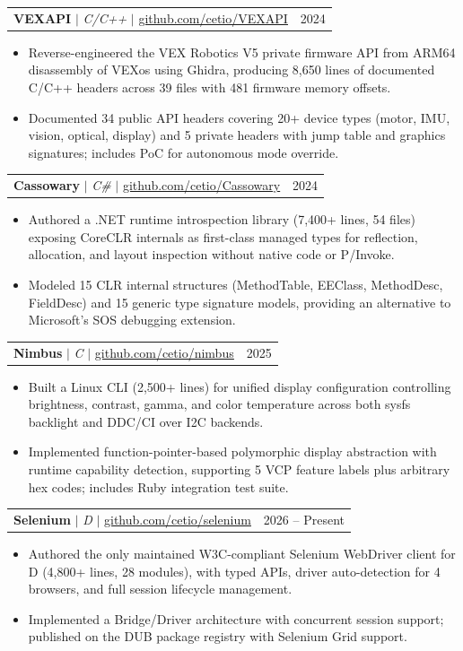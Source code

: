 \documentclass[letterpaper,11pt]{article}
\makeatletter
\newcommand{\resumeItem}[1]{
  \item\small{
    {#1 \vspace{0pt}}
  }
}
\newcommand{\resumeProjectHeading}[2]{
    \item
    \begin{tabular*}{0.97\textwidth}{l@{\extracolsep{\fill}}r}
      \small#1 & #2 \\
    \end{tabular*}\vspace{-5pt}
}
\newcommand{\resumeItemListStart}{\begin{itemize}[leftmargin=0.15in]}
\newcommand{\resumeItemListEnd}{\end{itemize}\vspace{-4pt}}
\makeatother
\begin{document}
      \resumeProjectHeading
          {\textbf{VEXAPI} $|$ \emph{C/C++} $|$ \href{https://github.com/cetio/VEXAPI}{\underline{github.com/cetio/VEXAPI}}}{2024}
          \resumeItemListStart
            \resumeItem{Reverse-engineered the VEX Robotics V5 private firmware API from ARM64 disassembly of VEXos using Ghidra, producing 8,650 lines of documented C/C++ headers across 39 files with 481 firmware memory offsets.}
            \resumeItem{Documented 34 public API headers covering 20+ device types (motor, IMU, vision, optical, display) and 5 private headers with jump table and graphics signatures; includes PoC for autonomous mode override.}
          \resumeItemListEnd

      \resumeProjectHeading
          {\textbf{Cassowary} $|$ \emph{C\#} $|$ \href{https://github.com/cetio/Cassowary}{\underline{github.com/cetio/Cassowary}}}{2024}
          \resumeItemListStart
            \resumeItem{Authored a .NET runtime introspection library (7,400+ lines, 54 files) exposing CoreCLR internals as first-class managed types for reflection, allocation, and layout inspection without native code or P/Invoke.}
            \resumeItem{Modeled 15 CLR internal structures (MethodTable, EEClass, MethodDesc, FieldDesc) and 15 generic type signature models, providing an alternative to Microsoft's SOS debugging extension.}
          \resumeItemListEnd

      \resumeProjectHeading
          {\textbf{Nimbus} $|$ \emph{C} $|$ \href{https://github.com/cetio/nimbus}{\underline{github.com/cetio/nimbus}}}{2025}
          \resumeItemListStart
            \resumeItem{Built a Linux CLI (2,500+ lines) for unified display configuration controlling brightness, contrast, gamma, and color temperature across both sysfs backlight and DDC/CI over I2C backends.}
            \resumeItem{Implemented function-pointer-based polymorphic display abstraction with runtime capability detection, supporting 5 VCP feature labels plus arbitrary hex codes; includes Ruby integration test suite.}
          \resumeItemListEnd

      \resumeProjectHeading
          {\textbf{Selenium} $|$ \emph{D} $|$ \href{https://www.github.com/cetio/selenium}{\underline{github.com/cetio/selenium}}}{2026 -- Present}
          \resumeItemListStart
            \resumeItem{Authored the only maintained W3C-compliant Selenium WebDriver client for D (4,800+ lines, 28 modules), with typed APIs, driver auto-detection for 4 browsers, and full session lifecycle management.}
            \resumeItem{Implemented a Bridge/Driver architecture with concurrent session support; published on the DUB package registry with Selenium Grid support.}
          \resumeItemListEnd
\end{document}
